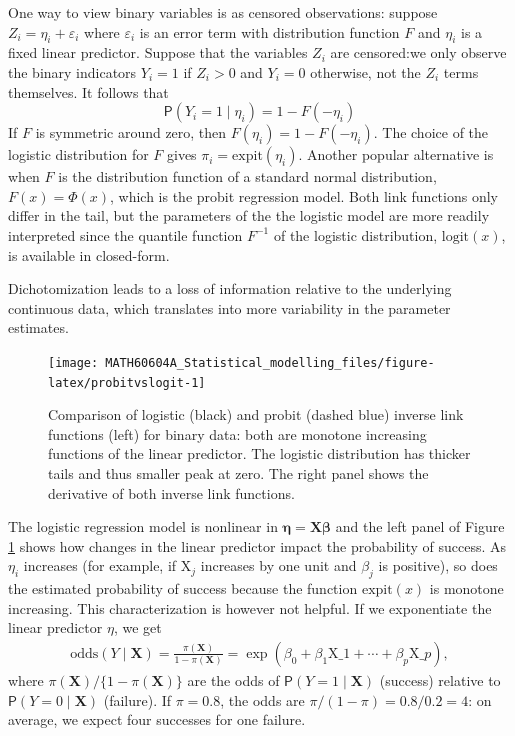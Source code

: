 \documentclass[
  11pt,
  letterpaper,
]{book}
\theoremstyle{definition}
\theoremstyle{definition}
\theoremstyle{definition}
\theoremstyle{remark}
\begin{document}
One way to view binary variables is as censored observations: suppose
\(Z_i = \eta_i + \varepsilon_i\) where \(\varepsilon_i\) is an error term
with distribution function \(F\) and \(\eta_i\) is a fixed linear predictor.
Suppose that the variables \(Z_i\) are censored:we only observe the binary
indicators \(Y_i = 1\) if \(Z_i > 0\) and \(Y_i=0\) otherwise, not the \(Z_i\)
terms themselves. It follows that \[
\mathsf{P}(Y_i = 1 \mid \eta_i) = 1-F(-\eta_i)
\] If \(F\) is symmetric around zero, then \(F(\eta_i) = 1-F(-\eta_i)\). The
choice of the logistic distribution for \(F\) gives
\(\pi_i = \mathrm{expit}(\eta_i)\). Another popular alternative is when
\(F\) is the distribution function of a standard normal distribution,
\(F(x) = \Phi(x)\), which is the probit regression model. Both link
functions only differ in the tail, but the parameters of the the
logistic model are more readily interpreted since the quantile function
\(F^{-1}\) of the logistic distribution, \(\mathrm{logit}(x)\), is available
in closed-form.

Dichotomization leads to a loss of information relative to the
underlying continuous data, which translates into more variability in
the parameter estimates.

\begin{figure}

{\centering \texttt{[image: MATH60604A\_Statistical\_modelling\_files/figure-latex/probitvslogit-1]} 

}

\caption{Comparison of logistic (black) and probit (dashed blue) inverse link functions (left) for binary data: both are monotone increasing functions of the linear predictor. The logistic distribution has thicker tails and thus smaller peak at zero. The right panel shows the derivative of both inverse link functions.}\label{fig:probitvslogit}
\end{figure}

The logistic regression model is nonlinear in
\(\boldsymbol{\eta}=\mathbf{X}\boldsymbol{\beta}\) and the left panel of
Figure \ref{fig:probitvslogit} shows how changes in the linear
predictor impact the probability of success. As \(\eta_i\) increases (for
example, if \(\mathrm{X}_j\) increases by one unit and \(\beta_j\) is
positive), so does the estimated probability of success because the
function \(\mathrm{expit}(x)\) is monotone increasing. This
characterization is however not helpful. If we exponentiate the linear
predictor \(\eta\), we get
\begin{align*}
\mathrm{odds}(Y\mid \mathbf{X}) =
\frac{\pi(\mathbf{X})}{1-\pi(\mathbf{X})}=\exp(\beta_0+ \beta_1
\mathrm{X}\_1 + \cdots + \beta_p\mathrm{X}\_p),
\end{align*}
where \(\pi(\mathbf{X})/\{1-\pi(\mathbf{X})\}\) are the odds of \(\mathsf{P}(Y=1 \mid \mathbf{X})\) (success) relative to \(\mathsf{P}(Y=0 \mid\mathbf{X})\) (failure). If \(\pi=0.8\), the odds are \(\pi/(1-\pi)=0.8/0.2=4\): on average, we expect four successes for one failure.
\end{document}
